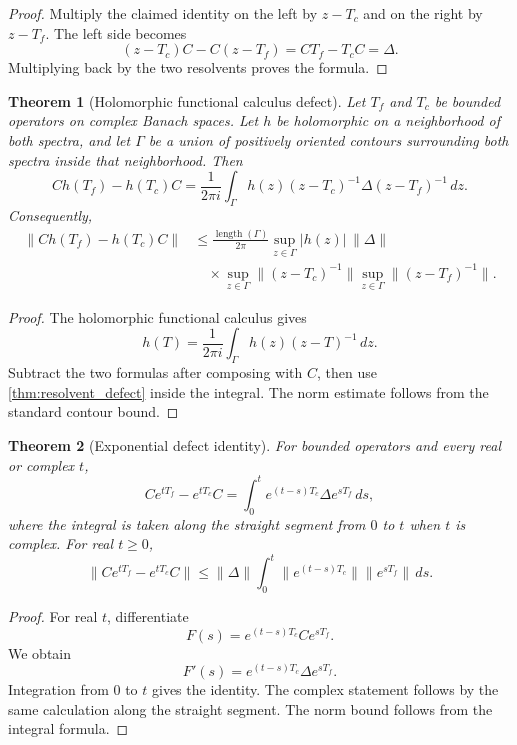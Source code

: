 \documentclass{aomart}
\newtheorem{theorem}{Theorem}[section]
\theoremstyle{definition}
\theoremstyle{remark}
\begin{document}
\begin{proof}
Multiply the claimed identity on the left by $z-T_c$ and on the right by $z-T_f$.  The left side becomes
\[
(z-T_c)C-C(z-T_f)
=
CT_f-T_cC
=
\Delta.
\]
Multiplying back by the two resolvents proves the formula.
\end{proof}

\begin{theorem}[Holomorphic functional calculus defect]\label{thm:holomorphic_defect}
Let $T_f$ and $T_c$ be bounded operators on complex Banach spaces.  Let $h$ be holomorphic on a neighborhood of both spectra, and let $\Gamma$ be a union of positively oriented contours surrounding both spectra inside that neighborhood.  Then
\[
Ch(T_f)-h(T_c)C
=
\frac{1}{2\pi i}
\int_\Gamma
h(z)(z-T_c)^{-1}\Delta(z-T_f)^{-1}\,dz.
\]
Consequently,
\begin{align*}
\|Ch(T_f)-h(T_c)C\|
&\leq
\frac{\operatorname{length}(\Gamma)}{2\pi}
\sup_{z\in\Gamma}|h(z)|\,\|\Delta\|\\
&\quad\times
\sup_{z\in\Gamma}\|(z-T_c)^{-1}\|
\sup_{z\in\Gamma}\|(z-T_f)^{-1}\|.
\end{align*}
\end{theorem}

\begin{proof}
The holomorphic functional calculus gives
\[
h(T)
=
\frac{1}{2\pi i}
\int_\Gamma h(z)(z-T)^{-1}\,dz.
\]
Subtract the two formulas after composing with $C$, then use \cref{thm:resolvent_defect} inside the integral.  The norm estimate follows from the standard contour bound.
\end{proof}

\begin{theorem}[Exponential defect identity]\label{thm:exponential_defect}
For bounded operators and every real or complex $t$,
\[
Ce^{tT_f}-e^{tT_c}C
=
\int_0^t e^{(t-s)T_c}\Delta e^{sT_f}\,ds,
\]
where the integral is taken along the straight segment from $0$ to $t$ when $t$ is complex.  For real $t\geq0$,
\[
\|Ce^{tT_f}-e^{tT_c}C\|
\leq
\|\Delta\|
\int_0^t
\|e^{(t-s)T_c}\|
\|e^{sT_f}\|\,ds.
\]
\end{theorem}

\begin{proof}
For real $t$, differentiate
\[
F(s)=e^{(t-s)T_c}Ce^{sT_f}.
\]
We obtain
\[
F'(s)=e^{(t-s)T_c}\Delta e^{sT_f}.
\]
Integration from $0$ to $t$ gives the identity.  The complex statement follows by the same calculation along the straight segment.  The norm bound follows from the integral formula.
\end{proof}
\end{document}
